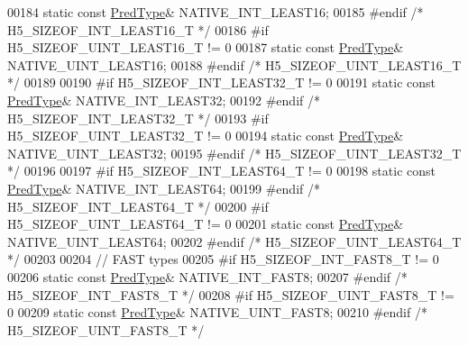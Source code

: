 \begin{DoxyCode}
00184         \textcolor{keyword}{static} \textcolor{keyword}{const} \hyperlink{class_h5_1_1_pred_type}{PredType}& NATIVE\_INT\_LEAST16;
00185 \textcolor{preprocessor}{#endif }\textcolor{comment}{/* H5\_SIZEOF\_INT\_LEAST16\_T */}\textcolor{preprocessor}{}
00186 \textcolor{preprocessor}{#if H5\_SIZEOF\_UINT\_LEAST16\_T != 0}
00187         \textcolor{keyword}{static} \textcolor{keyword}{const} \hyperlink{class_h5_1_1_pred_type}{PredType}& NATIVE\_UINT\_LEAST16;
00188 \textcolor{preprocessor}{#endif }\textcolor{comment}{/* H5\_SIZEOF\_UINT\_LEAST16\_T */}\textcolor{preprocessor}{}
00189 
00190 \textcolor{preprocessor}{#if H5\_SIZEOF\_INT\_LEAST32\_T != 0}
00191         \textcolor{keyword}{static} \textcolor{keyword}{const} \hyperlink{class_h5_1_1_pred_type}{PredType}& NATIVE\_INT\_LEAST32;
00192 \textcolor{preprocessor}{#endif }\textcolor{comment}{/* H5\_SIZEOF\_INT\_LEAST32\_T */}\textcolor{preprocessor}{}
00193 \textcolor{preprocessor}{#if H5\_SIZEOF\_UINT\_LEAST32\_T != 0}
00194         \textcolor{keyword}{static} \textcolor{keyword}{const} \hyperlink{class_h5_1_1_pred_type}{PredType}& NATIVE\_UINT\_LEAST32;
00195 \textcolor{preprocessor}{#endif }\textcolor{comment}{/* H5\_SIZEOF\_UINT\_LEAST32\_T */}\textcolor{preprocessor}{}
00196 
00197 \textcolor{preprocessor}{#if H5\_SIZEOF\_INT\_LEAST64\_T != 0}
00198         \textcolor{keyword}{static} \textcolor{keyword}{const} \hyperlink{class_h5_1_1_pred_type}{PredType}& NATIVE\_INT\_LEAST64;
00199 \textcolor{preprocessor}{#endif }\textcolor{comment}{/* H5\_SIZEOF\_INT\_LEAST64\_T */}\textcolor{preprocessor}{}
00200 \textcolor{preprocessor}{#if H5\_SIZEOF\_UINT\_LEAST64\_T != 0}
00201         \textcolor{keyword}{static} \textcolor{keyword}{const} \hyperlink{class_h5_1_1_pred_type}{PredType}& NATIVE\_UINT\_LEAST64;
00202 \textcolor{preprocessor}{#endif }\textcolor{comment}{/* H5\_SIZEOF\_UINT\_LEAST64\_T */}\textcolor{preprocessor}{}
00203 
00204 \textcolor{comment}{// FAST types}
00205 \textcolor{preprocessor}{#if H5\_SIZEOF\_INT\_FAST8\_T != 0}
00206         \textcolor{keyword}{static} \textcolor{keyword}{const} \hyperlink{class_h5_1_1_pred_type}{PredType}& NATIVE\_INT\_FAST8;
00207 \textcolor{preprocessor}{#endif }\textcolor{comment}{/* H5\_SIZEOF\_INT\_FAST8\_T */}\textcolor{preprocessor}{}
00208 \textcolor{preprocessor}{#if H5\_SIZEOF\_UINT\_FAST8\_T != 0}
00209         \textcolor{keyword}{static} \textcolor{keyword}{const} \hyperlink{class_h5_1_1_pred_type}{PredType}& NATIVE\_UINT\_FAST8;
00210 \textcolor{preprocessor}{#endif }\textcolor{comment}{/* H5\_SIZEOF\_UINT\_FAST8\_T */}\textcolor{preprocessor}{}

\end{DoxyCode}
